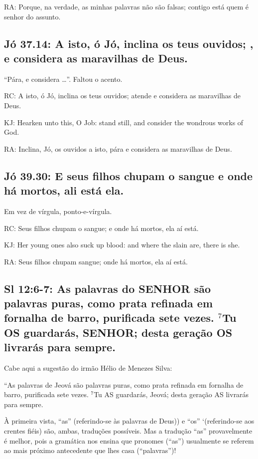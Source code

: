 RA: Porque, na verdade, as minhas palavras não são falsas; contigo está quem é senhor do assunto.

\subsection{Jó 37.14: A isto, ó Jó, inclina os teus ouvidos; , e considera as maravilhas de Deus.}

``Pára, e considera \ldots''. Faltou o acento.

RC: A isto, ó Jó, inclina os teus ouvidos; atende e considera as maravilhas de Deus.

KJ: Hearken unto this, O Job: stand still, and consider the wondrous works of God.

RA: Inclina, Jó, os ouvidos a isto, pára e considera as maravilhas de Deus.

\subsection{Jó 39.30: E seus filhos chupam o sangue\uwave{,} e onde há mortos, ali está ela.}
Em vez de vírgula, ponto-e-vírgula. 

RC: Seus filhos chupam o sangue; e onde há mortos, ela aí está.

KJ: Her young ones also suck up blood: and where the slain are, there is she.

RA: Seus filhos chupam sangue; onde há mortos, ela aí está.

\subsection{Sl 12:6-7: As palavras do SENHOR são palavras puras, como prata refinada em fornalha de barro, purificada sete vezes. $^{\mathrm{7}}$Tu OS guardarás, SENHOR; desta geração OS livrarás para sempre.}
Cabe aqui a sugestão do irmão Hélio de Menezes Silva:

``As palavras de Jeová são palavras puras, como prata refinada em fornalha de barro, purificada sete vezes. $^{\mathrm{7}}$Tu AS guardarás, Jeová; desta geração AS livrarás para sempre.

À primeira vista, ``as'' (referindo-se às palavras de Deus)) e ``os''
`(referindo-se aos crentes fiéis) são, ambas, traduções possíveis. Mas a
tradução ``as'' provavelmente é melhor, pois a gramática nos ensina que
pronomes (``as'') usualmente se referem ao mais próximo antecedente que
lhes casa (``palavras'')!

